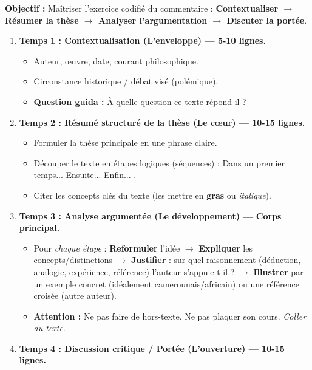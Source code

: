 \documentclass[11pt]{article}
\newcommand{\cle}[1]{{\popxbold\color{popdark}#1}}
\begin{document}
\begin{methode}
\textbf{Objectif :} Maîtriser l'exercice codifié du commentaire : \textbf{Contextualiser $\rightarrow$ Résumer la thèse $\rightarrow$ Analyser l'argumentation $\rightarrow$ Discuter la portée}.
\begin{enumerate}
    \item \textbf{Temps 1 : Contextualisation (L'enveloppe) — 5-10 lignes.}
        \begin{itemize}
            \item Auteur, œuvre, date, courant philosophique.
            \item Circonstance historique / débat visé (polémique).
            \item \textbf{Question guida :} À quelle question ce texte répond-il ?
        \end{itemize}
    \item \textbf{Temps 2 : Résumé structuré de la thèse (Le cœur) — 10-15 lignes.}
        \begin{itemize}
            \item Formuler la \cle{thèse principale} en une phrase claire.
            \item Découper le texte en \cle{étapes logiques} (séquences) : \guillemotleft Dans un premier temps... Ensuite... Enfin... \guillemotright.
            \item Citer les \cle{concepts clés} du texte (les mettre en \textbf{gras} ou \emph{italique}).
        \end{itemize}
    \item \textbf{Temps 3 : Analyse argumentée (Le développement) — Corps principal.}
        \begin{itemize}
            \item Pour \emph{chaque étape} : \textbf{Reformuler} l'idée $\rightarrow$ \textbf{Expliquer} les concepts/distinctions $\rightarrow$ \textbf{Justifier} : sur quel raisonnement (déduction, analogie, expérience, référence) l'auteur s'appuie-t-il ? $\rightarrow$ \textbf{Illustrer} par un exemple concret (idéalement camerounais/africain) ou une référence croisée (autre auteur).
            \item \textbf{Attention :} Ne pas faire de hors-texte. Ne pas plaquer son cours. \emph{Coller au texte}.
        \end{itemize}
    \item \textbf{Temps 4 : Discussion critique / Portée (L'ouverture) — 10-15 lignes.}

\end{enumerate}
\end{methode}
\end{document}
